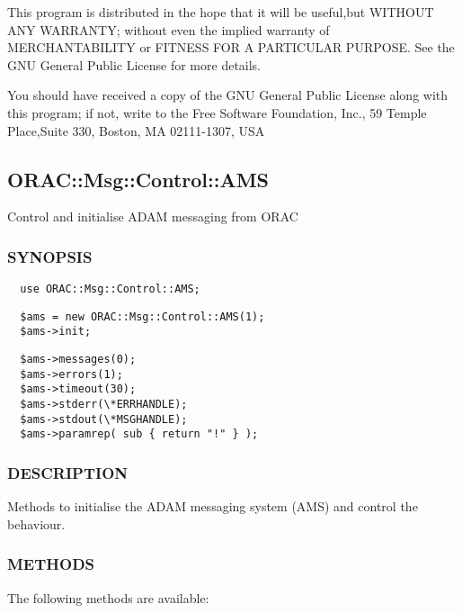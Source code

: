 \begin{description}
\begin{description}
This program is distributed in the hope that it will be useful,but WITHOUT ANY
WARRANTY; without even the implied warranty of MERCHANTABILITY or FITNESS FOR A
PARTICULAR PURPOSE. See the GNU General Public License for more details.



You should have received a copy of the GNU General Public License along with
this program; if not, write to the Free Software Foundation, Inc., 59 Temple
Place,Suite 330, Boston, MA  02111-1307, USA

\subsection{ORAC::Msg::Control::AMS\label{ORAC::Msg::Control::AMS}}


Control and initialise ADAM messaging from ORAC

\subsubsection*{SYNOPSIS\label{ORAC::Msg::Control::AMS_SYNOPSIS}}
\begin{verbatim}
  use ORAC::Msg::Control::AMS;
\end{verbatim}
\begin{verbatim}
  $ams = new ORAC::Msg::Control::AMS(1);
  $ams->init;
\end{verbatim}
\begin{verbatim}
  $ams->messages(0);
  $ams->errors(1);
  $ams->timeout(30);
  $ams->stderr(\*ERRHANDLE);
  $ams->stdout(\*MSGHANDLE);
  $ams->paramrep( sub { return "!" } );
\end{verbatim}
\subsubsection*{DESCRIPTION\label{ORAC::Msg::Control::AMS_DESCRIPTION}}


Methods to initialise the ADAM messaging system (AMS) and control the
behaviour.

\subsubsection*{METHODS\label{ORAC::Msg::Control::AMS_METHODS}}


The following methods are available:


\end{description}
\end{description}
